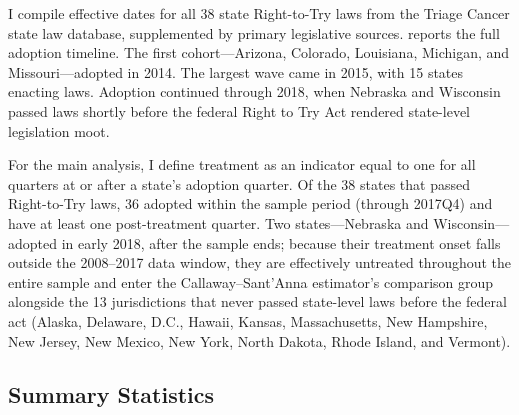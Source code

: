 \documentclass[12pt]{article}
\begin{document}
I compile effective dates for all 38 state Right-to-Try laws from the Triage Cancer state law database, supplemented by primary legislative sources.  reports the full adoption timeline. The first cohort---Arizona, Colorado, Louisiana, Michigan, and Missouri---adopted in 2014. The largest wave came in 2015, with 15 states enacting laws. Adoption continued through 2018, when Nebraska and Wisconsin passed laws shortly before the federal Right to Try Act rendered state-level legislation moot.

For the main analysis, I define treatment as an indicator equal to one for all quarters at or after a state's adoption quarter. Of the 38 states that passed Right-to-Try laws, 36 adopted within the sample period (through 2017Q4) and have at least one post-treatment quarter. Two states---Nebraska and Wisconsin---adopted in early 2018, after the sample ends; because their treatment onset falls outside the 2008--2017 data window, they are effectively untreated throughout the entire sample and enter the Callaway--Sant'Anna estimator's comparison group alongside the 13 jurisdictions that never passed state-level laws before the federal act (Alaska, Delaware, D.C., Hawaii, Kansas, Massachusetts, New Hampshire, New Jersey, New Mexico, New York, North Dakota, Rhode Island, and Vermont).

\subsection{Summary Statistics}
\end{document}
